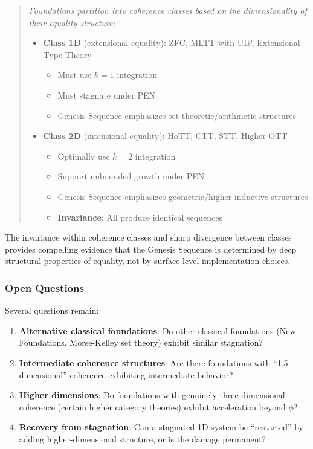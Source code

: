 \documentclass[11pt]{article}
\theoremstyle{definition}
\theoremstyle{remark}
\begin{document}
\begin{quote}
\textit{Foundations partition into coherence classes based on the dimensionality of their equality structure:}
\begin{itemize}
\item \textbf{Class 1D} (extensional equality): ZFC, MLTT with UIP, Extensional Type Theory
\begin{itemize}
\item Must use $k=1$ integration
\item Must stagnate under PEN
\item Genesis Sequence emphasizes set-theoretic/arithmetic structures
\end{itemize}

\item \textbf{Class 2D} (intensional equality): HoTT, CTT, STT, Higher OTT
\begin{itemize}
\item Optimally use $k=2$ integration
\item Support unbounded growth under PEN
\item Genesis Sequence emphasizes geometric/higher-inductive structures
\item \textbf{Invariance}: All produce identical sequences
\end{itemize}
\end{itemize}
\end{quote}

The invariance within coherence classes and sharp divergence between classes provides compelling evidence that the Genesis Sequence is determined by deep structural properties of equality, not by surface-level implementation choices.

\subsubsection{Open Questions}

Several questions remain:

\begin{enumerate}
\item \textbf{Alternative classical foundations}: Do other classical foundations (New Foundations, Morse-Kelley set theory) exhibit similar stagnation?

\item \textbf{Intermediate coherence structures}: Are there foundations with ``1.5-dimensional'' coherence exhibiting intermediate behavior?

\item \textbf{Higher dimensions}: Do foundations with genuinely three-dimensional coherence (certain higher category theories) exhibit acceleration beyond $\phi$?

\item \textbf{Recovery from stagnation}: Can a stagnated 1D system be ``restarted'' by adding higher-dimensional structure, or is the damage permanent?
\end{enumerate}
\end{document}
